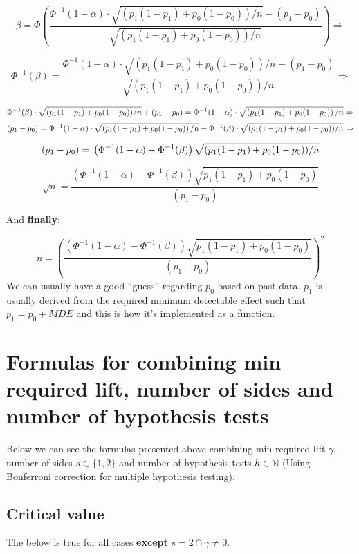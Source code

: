 \documentclass[
]{article}
\begin{document}
\[\beta = \Phi\left(\frac{\Phi^{-1}(1 - \alpha) \cdot \sqrt{\left(p_1(1-p_1) + p_0(1-p_0)\right)/n} - (p_1 - p_0)}{\sqrt{(p_1(1-p_1) + p_0(1-p_0))/n}}\right) \Rightarrow\]

\[\Phi^{-1}(\beta) = \frac{\Phi^{-1}(1 - \alpha) \cdot \sqrt{\left(p_1(1-p_1) + p_0(1-p_0)\right)/n} - (p_1 - p_0)}{\sqrt{(p_1(1-p_1) + p_0(1-p_0))/n}} \Rightarrow\]

\[\Phi^{-1}(\beta) \cdot \sqrt{(p_1(1-p_1) + p_0(1-p_0))/n} + (p_1 - p_0) = \\ \Phi^{-1}(1 - \alpha) \cdot \sqrt{\left(p_1(1-p_1) + p_0(1-p_0)\right)/n} \Rightarrow\]
\[(p_1 - p_0) = \\ \Phi^{-1}(1 - \alpha) \cdot \sqrt{\left(p_1(1-p_1) + p_0(1-p_0)\right)/n} - \Phi^{-1}(\beta) \cdot \sqrt{(p_1(1-p_1) + p_0(1-p_0))/n} \Rightarrow\]

\[(p_1 - p_0) = \\ \left(\Phi^{-1}(1 - \alpha) - \Phi^{-1}(\beta)\right)\sqrt{(p_1(1-p_1) + p_0(1-p_0))/n} \]

\[\sqrt{n} = \frac{\left(\Phi^{-1}(1 - \alpha) - \Phi^{-1}(\beta)\right)\sqrt{p_1(1-p_1) + p_0(1-p_0)}}{(p_1 - p_0)}\]

And \textbf{finally}:

\[\boxed{n = \left(\frac{\left(\Phi^{-1}(1 - \alpha) - \Phi^{-1}(\beta)\right)\sqrt{p_1(1-p_1) + p_0(1-p_0)}}{(p_1 - p_0)}\right)^2}\]
We can usually have a good ``guess'' regarding \(p_0\) based on past
data. \(p_1\) is usually derived from the required minimum detectable
effect such that \(p_1 = p_0 + MDE\) and this is how it's implemented as
a function.

\hypertarget{formulas}{%
\section{Formulas for combining min required lift, number of sides and
number of hypothesis tests}\label{formulas}}

Below we can see the formulas presented above combining min required
lift \(\gamma\), number of sides \(s \in \{1,2\}\) and number of
hypothesis tests \(h \in \mathbb{N}\) (Using Bonferroni correction for
multiple hypothesis testing).

\hypertarget{critical-value}{%
\subsection{Critical value}\label{critical-value}}

The below is true for all cases \textbf{except}
\(s = 2 \cap \gamma \neq0\).
\end{document}
